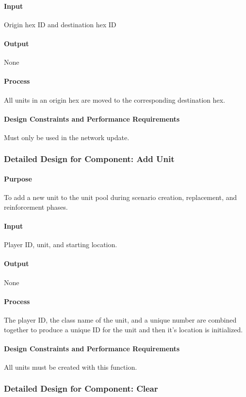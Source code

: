 \documentclass[12pt,a4paper,titlepage]{article}
\begin{document}
\paragraph{Input} Origin hex ID and destination hex ID
\paragraph{Output} None
\paragraph{Process} All units in an origin hex are moved to the corresponding destination hex.
\paragraph{Design Constraints and Performance Requirements} Must only be used in the network update.

\subsubsection{Detailed Design for Component: Add Unit}
\paragraph{Purpose} To add a new unit to the unit pool during scenario creation, replacement, and reinforcement phases.
\paragraph{Input} Player ID, unit, and starting location.
\paragraph{Output} None
\paragraph{Process} The player ID, the class name of the unit, and a unique number are combined together to produce a unique ID for the unit and then it's location is initialized.
\paragraph{Design Constraints and Performance Requirements} All units must be created with this function.

\subsubsection{Detailed Design for Component: Clear}
\end{document}
